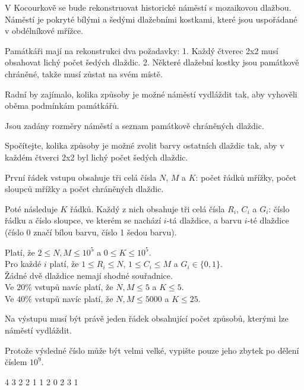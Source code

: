 





V Kocourkově se bude rekonstruovat historické náměstí s mozaikovou dlažbou.
Náměstí je pokryté bílými a šedými dlažebními kostkami, které jsou uspořádané v obdélníkové mřížce.

Památkáři mají na rekonstrukci dva požadavky:
1. Každý čtverec 2x2 musí obsahovat lichý počet šedých dlaždic.
2. Některé dlažební kostky jsou památkově chráněné, takže musí zůstat na svém místě.

Radní by zajímalo, kolika způsoby je možné náměstí vydláždit tak, aby vyhověli oběma podmínkám památkářů.


Jsou zadány rozměry náměstí a seznam památkově chráněných dlaždic.

Spočítejte, kolika způsoby je možné zvolit barvy ostatních dlaždic tak, aby v každém čtverci 2x2 byl lichý počet šedých dlaždic.


První řádek vstupu obsahuje tři celá čísla $N$, $M$ a $K$: počet řádků mřížky, počet sloupců mřížky a počet chráněných dlaždic.

Poté následuje $K$ řádků. Každý z nich obsahuje tři celá čísla $R_i$, $C_i$ a $G_i$: číslo řádku a číslo sloupce, ve kterém se nachází $i$-tá dlaždice, a barvu $i$-té dlaždice (číslo 0 značí bílou barvu, číslo 1 šedou barvu).

\bigskip
\noindent
Platí, že $2 \leq N,M \leq 10^5$ a $0 \leq K \leq 10^5$.\\
Pro každé $i$ platí, že $1 \leq R_i \leq N$, $1 \leq C_i \leq M$ a $G_i \in \{ 0, 1 \}$.\\
Žádné dvě dlaždice nemají shodné souřadnice.\\
Ve $20\%$ vstupů navíc platí, že $N,M \leq 5$ a $K \leq 5$.\\
Ve $40\%$ vstupů navíc platí, že $N,M \leq 5000$ a $K \leq 25$.


Na výstupu musí být právě jeden řádek obsahující počet způsobů, kterými lze náměstí vydláždit.

Protože výsledné číslo může být velmi velké, vypište pouze jeho zbytek po dělení číslem $10^9$.


 4 3
2 2 1
1 2 0
2 3 1
\sampleEND


